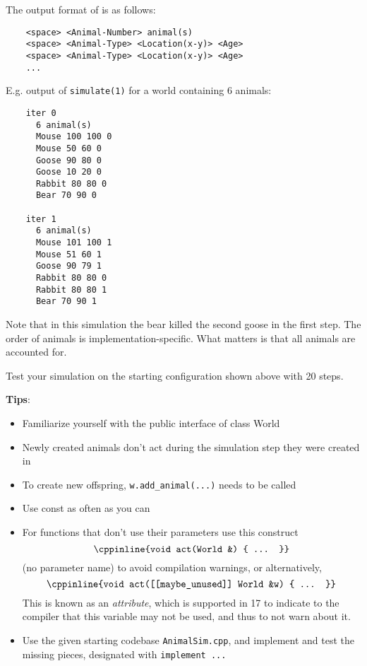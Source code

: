 \documentclass[a4paper,11pt]{article}
\begin{document}
\medskip

The output format of  is as follows:
\begin{verbatim}
    <space> <Animal-Number> animal(s)
    <space> <Animal-Type> <Location(x-y)> <Age>
    <space> <Animal-Type> <Location(x-y)> <Age>
    ...      
\end{verbatim}

E.g. output of \texttt{simulate(1)} for a world containing 6 animals:
\begin{verbatim}
    iter 0
      6 animal(s)
      Mouse 100 100 0
      Mouse 50 60 0
      Goose 90 80 0
      Goose 10 20 0
      Rabbit 80 80 0
      Bear 70 90 0

    iter 1
      6 animal(s)
      Mouse 101 100 1
      Mouse 51 60 1
      Goose 90 79 1
      Rabbit 80 80 0
      Rabbit 80 80 1
      Bear 70 90 1
\end{verbatim}

Note that in this simulation the bear killed the second goose in the first
step. The order of animals is implementation-specific. What matters is that
all animals are accounted for.

Test your simulation on the starting configuration shown above with 20 steps.

\bigskip 

\textbf{Tips}:
\begin{itemize}
    \item Familiarize yourself with the public interface of class World
    \item Newly created animals don't act during the simulation step they were created in
    \item To create new offspring, \texttt{w.add\_animal(...)} needs to be called
    \item Use const as often as you can
    \item For functions that don't use their parameters use this construct
        \[ \cppinline{void act(World &) { ... }} \]
        (no parameter name) to avoid compilation warnings, 
        or alternatively,
        \[ \cppinline{void act([[maybe_unused]] World &w) { ... }} \]
        This is known as an \textit{attribute}, which is supported in {\CC}17 
        to indicate to the compiler that this variable may not be used,
        and thus to not warn about it.
    \item Use the given starting codebase \texttt{AnimalSim.cpp}, and implement and test the missing pieces,
        designated with \texttt{implement ...}
\end{itemize}


\end{document}
